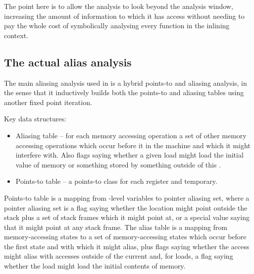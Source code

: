 The point here is to allow the analysis to look beyond the analysis
window, increasing the amount of information to which it has access
without needing to pay the whole cost of symbolically analysing every
function in the inlining context.


\subsection{The actual alias analysis}



The main aliasing analysis used in {\technique} is a hybrid points-to
and aliasing analysis, in the sense that it inductively builds both
the points-to and aliasing tables using another fixed point iteration.

Key data structures:

\begin{itemize}
\item
  Aliasing table -- for each memory accessing operation a set of other
  memory accessing operations which occur before it in the machine and
  which it might interfere with.  Also flags saying whether a given
  load might load the initial value of memory or something stored
  by something outside of this \StateMachine.
\item
  Points-to table -- a points-to class for each register and temporary.
\end{itemize}

Points-to table is a mapping from {\StateMachine}-level variables to
pointer aliasing set, where a pointer aliasing set is a flag saying
whether the location might point outside the stack plus a set of stack
frames which it might point at, or a special value saying that it
might point at any stack frame.  The alias table is a mapping
from memory-accessing {\StateMachine} states to a set of
memory-accessing {\StateMachine} states which occur before the first
state and with which it might alias, plus flags saying whether the
access might alias with accesses outside of the current
{\StateMachine} and, for loads, a flag saying whether the load might
load the initial contents of memory.


